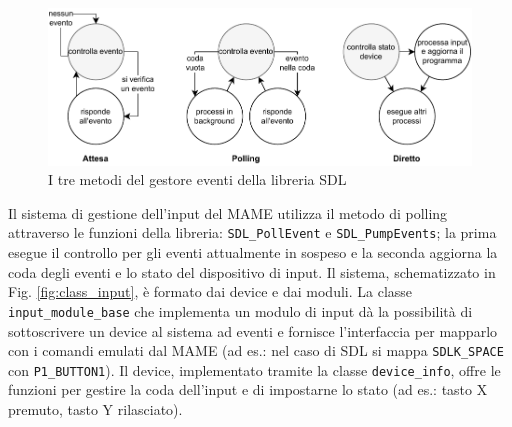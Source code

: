 \begin{figure}[H]
	\includegraphics[width=\linewidth]{immagini/input_event_mode}
	\caption{I tre metodi del gestore eventi della libreria SDL}
	\label{fig:input_event_mode}
\end{figure}




Il sistema di gestione dell'input del MAME utilizza il metodo di polling attraverso le funzioni della libreria: \verb|SDL_PollEvent| e \verb|SDL_PumpEvents|; la prima esegue il controllo per gli eventi attualmente in sospeso e la seconda aggiorna la coda degli eventi e lo stato del dispositivo di input. Il sistema, schematizzato in Fig. \ref{fig:class_input}, è formato dai device e dai moduli. La classe \verb|input_module_base| che implementa un modulo di input dà la possibilità di sottoscrivere un device al sistema ad eventi e fornisce l'interfaccia per mapparlo con i comandi emulati dal MAME (ad es.: nel caso di SDL si mappa \verb|SDLK_SPACE| con \verb|P1_BUTTON1|). Il device, implementato tramite la classe \verb|device_info|, offre le funzioni per gestire la coda dell'input e di impostarne lo stato (ad es.: tasto X premuto, tasto Y rilasciato).

